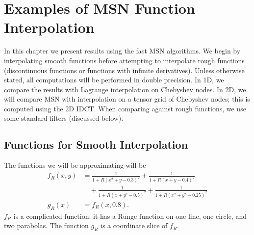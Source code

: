 \chapter{Examples of MSN Function Interpolation}
\label{chap:func_interp}

In this chapter we present results using the fast MSN algorithms.
We begin by interpolating smooth functions before
attempting to interpolate rough functions (discontinuous functions
or functions with infinite derivatives).
Unless otherwise stated, all computations will be performed
in double precision.
In 1D, we compare the results with Lagrange interpolation on
Chebyshev nodes.
In 2D, we will compare MSN with interpolation on a tensor grid of
Chebyshev nodes; this is computed using the 2D IDCT.
When comparing against rough functions, we use some standard
filters (discussed below).

\section{Functions for Smooth Interpolation}

The functions we will be approximating will be
%
\begin{align}
    f_{R}(x,y) &= \frac{1}{1+ R(x^2 + y - 0.3)^{2}}
       + \frac{1}{1+ R(x + y - 0.4)^{2}} \nonumber\\
       &\quad+ \frac{1}{1+ R(x + y^{2} - 0.5)^{2}}
       + \frac{1}{1+ R(x^{2} + y^{2} - 0.25)^{2}} \nonumber\\
    g_{R}(x) &= f_{R}(x,0.8).
\end{align}
%
$f_{R}$ is a complicated function: it has a Runge function
on one line, one circle, and two parabolas.
The function $g_{R}$ is a coordinate slice of $f_{R}$.










%



